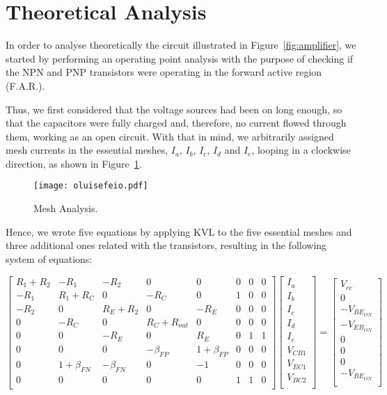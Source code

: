 \section{Theoretical Analysis}
\label{sec:analysis}

In order to analyse theoretically the circuit illustrated in Figure~\ref{fig:amplifier}, we started by performing an operating point analysis with the purpose of checking if the NPN and PNP transistors were operating in the forward active region (F.A.R.). 

Thus, we first considered that the voltage sources had been on long enough, so that the capacitors were fully charged and, therefore, no current flowed through them, working as an open circuit. With that in mind, we arbitrarily assigned mesh currents in the essential meshes, $I_a$, $I_b$, $I_c$, $I_d$ and $I_e$, looping in a clockwise direction, as shown in Figure~\ref{fig:mesh}.

\begin{figure}[H] \centering
\texttt{[image: oluisefeio.pdf]}
\caption{Mesh Analysis.}
\label{fig:mesh}
\end{figure}

Hence, we wrote five equations by applying KVL to the five essential meshes and three additional ones related with the transistors, resulting in the following system of equations:

\[
{\begin{bmatrix}
R_1+R_2 & -R_1 & -R_2 & 0 & 0 & 0 & 0 & 0\\
-R_1 & R_1+R_C & 0 & -R_C & 0 & 1 & 0 & 0\\
-R_2 & 0 & R_E+R_2 & 0 & -R_E & 0 & 0 & 0\\
0 & -R_C & 0 & R_C+R_{out} & 0 & 0 & 0 & 0\\
0 & 0 & -R_E & 0 & R_E & 0 & 1 & 1\\
0 & 0 & 0 & -\beta_{FP} & 1+\beta_{FP} & 0 & 0 & 0\\
0 & 1+\beta_{FN} & -\beta_{FN} & 0 & -1 & 0 & 0 & 0\\
0 & 0 & 0 & 0 & 0 & 1 & 1 & 0\\
            \end{bmatrix}
            }
{\begin{bmatrix}
I_a\\
I_b\\
I_c\\
I_d\\
I_e\\
V_{CB1}\\
V_{EC1}\\
V_{BC2}\\
            \end{bmatrix}
            }
    =
{\begin{bmatrix}
V_{cc}\\
0\\
-V_{{BE}_{ON}}\\
-V_{{EB}_{ON}}\\
0\\
0\\
0\\
-V_{{BE}_{ON}}\\
            \end{bmatrix}
            }
\]

